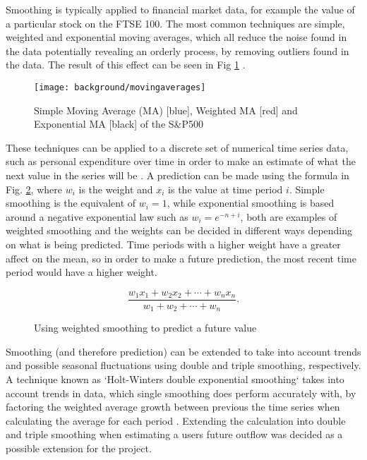 Smoothing is typically applied to financial market data, for example the value of a particular stock on the FTSE 100. The most common techniques are simple, weighted and exponential moving averages, which all reduce the noise found in the data potentially revealing an orderly process, by removing outliers found in the data. The result of this effect can be seen in Fig \ref{fig:dashweightedaverages} \parencite{dash2012movingaverages}.

\begin{figure}[h]
    \centering
    \texttt{[image: background/movingaverages]}
    \caption[SMA, WMA and EMA of the S\&P500]{Simple Moving Average (MA) [blue], Weighted MA [red] and Exponential MA [black] of the S\&P500\protect\footnotemark  \parencite[Fig. 5]{dash2012movingaverages}}
    \label{fig:dashweightedaverages}
\end{figure}

These techniques can be applied to a discrete set of numerical time series data, such as personal expenditure over time in order to make an estimate of what the next value in the series will be \parencite{filliben2003nist}. A prediction can be made using the formula in Fig. \ref{fig:weightedmeanforumla}, where $w_{i}$ is the weight and $x_i$ is the value at time period $i$. Simple smoothing is the equivalent of $w_i = 1$, while exponential smoothing is based around a negative exponential law such as $w_i = e^{-n+i}$, both are examples of weighted smoothing and the weights can be decided in different ways depending on what is being predicted. Time periods with a higher weight have a greater affect on the mean, so in order to make a future prediction, the most recent time period would have a higher weight.

\begin{figure}[h]
    \centering
    \[
        \frac{w_1 x_1 + w_2 x_2 + \cdots + w_n x_n}{w_1 + w_2 + \cdots + w_n}.
    \]
    \caption{Using weighted smoothing to predict a future value}
    \label{fig:weightedmeanforumla}
\end{figure}

Smoothing (and therefore prediction) can be extended to take into account trends and possible seasonal fluctuations using double and triple smoothing, respectively. A technique known as `Holt-Winters double exponential smoothing` takes into account trends in data, which single smoothing does perform accurately with, by factoring the weighted average growth between previous the time series when calculating the average for each period \parencite{kalekar2004holtwinters}.  
% 
Extending the calculation into double and triple smoothing when estimating a users future outflow was decided as a possible extension for the project.  

